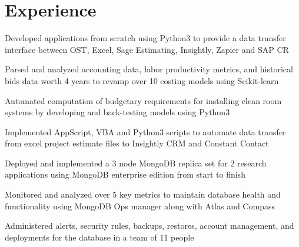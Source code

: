 \documentclass[]{two-column}
\begin{document}
\begin{minipage}[t]{0.66\textwidth} 


\section{Experience}
\vspace{\topsep}
\begin{tightemize}
\item Developed applications from scratch using Python3 to provide a data transfer interface between OST, Excel, Sage Estimating, Insightly, Zapier and SAP CR
\vspace{1pt}
\item Parsed and analyzed accounting data, labor productivity metrics, and historical bids data worth 4 years to revamp over 10 costing models using Scikit-learn
\vspace{1pt}
\item Automated computation of budgetary requirements for installing clean room systems by developing and back-testing models using Python3
\vspace{1pt}
\item Implemented AppScript, VBA and Python3 scripts to automate data transfer from excel project estimate files to Insightly CRM and Constant Contact
\end{tightemize}
\sectionsep
{}
\vspace{1pt}
\begin{tightemize}
\item Deployed and implemented a 3 node MongoDB replica set for 2 research applications using MongoDB enterprise edition from start to finish

\vspace{1pt}
\item Monitored and analyzed over 5 key metrics to maintain database health and functionality using MongoDB Ops manager along with Atlas and Compass

\vspace{1pt}
\item Administered alerts, security rules, backups, restores, account management, and deployments for the database in a team of 11 people


\end{tightemize}
\end{minipage}
\end{document}
